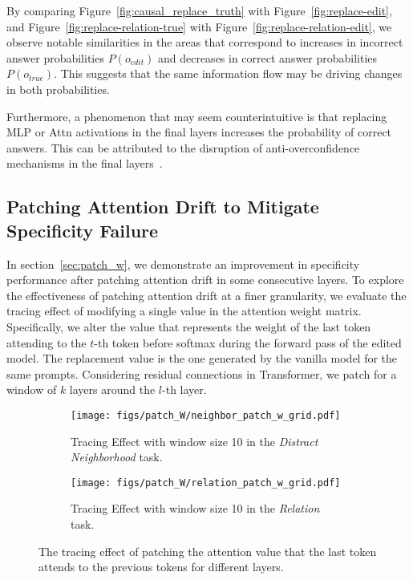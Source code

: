 By comparing Figure~\ref{fig:causal_replace_truth} with Figure~\ref{fig:replace-edit}, and Figure~\ref{fig:replace-relation-true} with Figure~\ref{fig:replace-relation-edit}, we observe notable similarities in the areas that correspond to increases in incorrect answer probabilities $P(o_{edit})$ and decreases in correct answer probabilities $P(o_{true})$. This suggests that the same information flow may be driving changes in both probabilities.

Furthermore, a phenomenon that may seem counterintuitive is that replacing MLP or Attn activations in the final layers increases the probability of correct answers. 
This can be attributed to the disruption of anti-overconfidence mechanisms in the final layers~\citep{lv2024interpreting}.

\subsection{Patching Attention Drift to Mitigate Specificity Failure}
\label{app:patch}
In section~\ref{sec:patch_w}, we demonstrate an improvement in specificity performance after patching attention drift in some consecutive layers.
To explore the effectiveness of patching attention drift at a finer granularity, we evaluate the tracing effect of modifying a single value in the attention weight matrix.
Specifically, we alter the value that represents the weight of the last token attending to the $t$-th token before softmax during the forward pass of the edited model.
The replacement value is the one generated by the vanilla model for the same prompts.
Considering residual connections in Transformer, we patch for a window of $k$ layers around the $l$-th layer.
\begin{figure}[htbp]
    \centering
    \begin{subfigure}{0.85\textwidth}
        \centering
        \texttt{[image: figs/patch\_W/neighbor\_patch\_w\_grid.pdf]}
        \caption{Tracing Effect with window size 10 in the \textit{Distract Neighborhood} task.}
    \end{subfigure}%
    \vspace{5pt}

    \begin{subfigure}{0.85\textwidth}
        \centering
        \texttt{[image: figs/patch\_W/relation\_patch\_w\_grid.pdf]}
        \caption{Tracing Effect with window size 10 in the \textit{Relation} task.}
    \end{subfigure}
    \vspace{5pt}

    \caption{The tracing effect of patching the attention value that the last token attends to the previous tokens for different layers.}
    \label{fig:patch_w_fine}
\end{figure}

